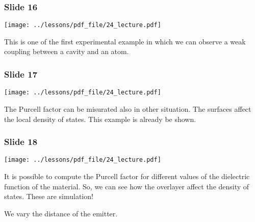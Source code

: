 \documentclass[../main/main.tex]{subfiles}
\begin{document}
\subsubsection*{Slide 16}

\begin{minipage}[]{0.5\linewidth}
\centering
\texttt{[image: ../lessons/pdf\_file/24\_lecture.pdf]}
\end{minipage}
\hspace{0.3cm}\vspace{0.3cm}
\begin{minipage}[c]{0.47\linewidth}

This is one of the first experimental example in which we can observe a weak coupling between a cavity and an atom.

\end{minipage}

\subsubsection*{Slide 17}

\begin{minipage}[]{0.5\linewidth}
\centering
\texttt{[image: ../lessons/pdf\_file/24\_lecture.pdf]}
\end{minipage}
\hspace{0.3cm}\vspace{0.3cm}
\begin{minipage}[c]{0.47\linewidth}

The Purcell factor can be misurated also in other situation. The surfaces affect the local density of states. This example is already be shown.

\end{minipage}

\subsubsection*{Slide 18}

\begin{minipage}[]{0.5\linewidth}
\centering
\texttt{[image: ../lessons/pdf\_file/24\_lecture.pdf]}
\end{minipage}
\hspace{0.3cm}\vspace{0.3cm}
\begin{minipage}[c]{0.47\linewidth}

It is possible to compute the Purcell factor for different values of the dielectric function of the material. So, we can see how the overlayer affect the density of states. These are simulation!

We vary the distance of the emitter.

\end{minipage}
\end{document}
